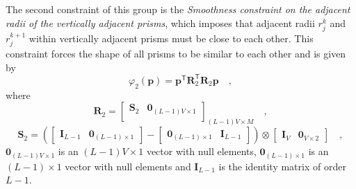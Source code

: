 The second constraint of this group is the \textit{Smoothness constraint on the adjacent radii of the 
vertically adjacent prisms}, which imposes that adjacent radii $r_{j}^{k}$ and $r_{j}^{k+1}$ within vertically 
adjacent prisms must be close to each other. This constraint forces the shape of all prisms to be similar to each other
and is given by
\begin{equation}
\varphi_{2}(\mathbf{p}) = \mathbf{p}^{\mathsf{T}} \mathbf{R}^{\mathsf{T}}_{2}\mathbf{R}_{2}\mathbf{p} \quad ,
\label{eq:phi2}
\end{equation}
where 
\begin{equation}
\mathbf{R}_{2} = 
\begin{bmatrix}
\mathbf{S}_{2} & \mathbf{0}_{(L-1)V \times 1} \\
\end{bmatrix}_{(L-1)V \times M} \quad ,
\label{eq:R2-matrix}
\end{equation}
\begin{equation}
\mathbf{S}_{2} =
\left( 
\begin{bmatrix} \mathbf{I}_{L-1} & \mathbf{0}_{(L-1) \times 1} \end{bmatrix} -
\begin{bmatrix} \mathbf{0}_{(L-1) \times 1} & \mathbf{I}_{L-1} \end{bmatrix} 
\right) \otimes 
\begin{bmatrix} \mathbf{I}_{V} & \mathbf{0}_{V \times 2} \end{bmatrix} \quad ,
\label{eq:S2-matrix}
\end{equation}
$\mathbf{0}_{(L-1)V \times 1}$ is an $(L-1)V \times 1$ vector with null elements,
$\mathbf{0}_{(L-1) \times 1}$ is an $(L-1) \times 1$ vector with null elements and 
$\mathbf{I}_{L-1}$ is the identity matrix of order $L-1$.

